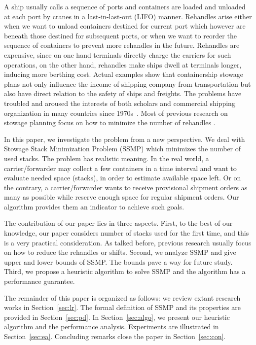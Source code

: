 \documentclass[review,3p,times,authoryear,12pt]{elsarticle}
\begin{document}
A ship usually calls a sequence of ports and containers are loaded and unloaded at each port by cranes in a last-in-last-out (LIFO) manner.
Rehandles arise either when we want to unload containers destined for current port which however are beneath those destined for subsequent ports, or when we want to reorder the sequence of containers to prevent more rehandles in the future.
Rehandles are expensive, since on one hand terminals directly charge the carriers for such operations, on the other hand, rehandles make ships dwell at terminals longer, inducing more berthing cost.
Actual examples show that containership stowage plans not only influence the income of shipping company from transportation but also have direct relation to the safety of ships and freights.
The problems have troubled and aroused the interests of both scholars and commercial shipping organization in many countries since 1970s~\citep{webster1970container}.
Most of previous research on stowage planning focus on how to minimize the number of rehandles \citep{ding2015stowage,zhang2016multiobjective,zehendner2017algorithm}.

In this paper, we investigate the problem from a new perspective. We deal with Stowage Stack Minimization Problem (SSMP) which minimizes the number of used stacks.
The problem has realistic meaning. In the real world, a carrier/forwarder may collect a few containers in a time interval and want to evaluate needed space (stacks), in order to estimate available space left.
Or on the contrary, a carrier/forwarder wants to receive provisional shipment orders as many as possible while reserve enough space for regular shipment orders.
Our algorithm provides them an indicator to achieve such goals.

The contribution of our paper lies in three aspects.
First, to the best of our knowledge, our paper considers number of stacks used for the first time, and this is a very practical consideration.
As talked before, previous research usually focus on how to reduce the rehandles or shifts.
Second, we analyze SSMP and give upper and lower bounds of SSMP. The bounds pave a way for future study.
Third, we propose a heuristic algorithm to solve SSMP and the algorithm has a performance guarantee.

The remainder of this paper is organized as follows: we review extant research works in Section~\ref{sec:lr}. The formal definition of SSMP and its properties are provided in Section~\ref{sec:pd}.
In Section~\ref{sec:algo}, we present our heuristic algorithm and the performance analysis.
Experiments are illustrated in Section~\ref{sec:ea}. Concluding remarks close the paper in Section~\ref{sec:con}.
\end{document}
